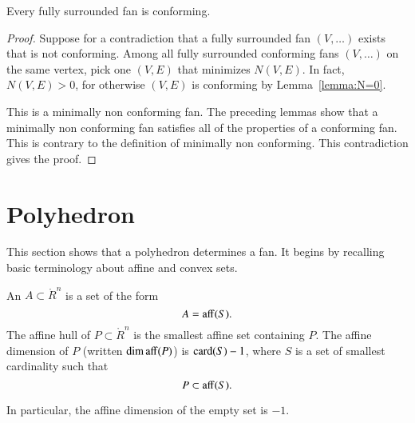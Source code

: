 \begin{lemma}\label{lemma:face}
Every fully surrounded fan is conforming.
\end{lemma}

\begin{proof}
Suppose for a contradiction that a fully surrounded fan $(V,\ldots)$
exists that is not conforming.  Among all fully surrounded
conforming fans $(V,\ldots)$ on the same vertex, pick one $(V,E)$
that minimizes $N(V,E)$.  In fact, $N(V,E)>0$, for otherwise $(V,E)$
is conforming by Lemma~\ref{lemma:N=0}.

This is a minimally non conforming fan.  The preceding lemmas show
that a minimally non conforming fan satisfies all of the properties
of a conforming fan.  This is contrary to the definition of
minimally non conforming.  This contradiction gives the proof.
\end{proof}



\section{Polyhedron}

This section shows that a polyhedron determines a fan.  It begins by
recalling basic terminology about affine and convex sets.

\begin{definition}
An   $A\subset\ring{R}^n$ is a set of the form
\begin{displaymath}
A={\operatorname{aff}}(S).
\end{displaymath}
The affine hull of $P\subset\ring{R}^n$ is the smallest affine set
containing $P$.  The affine dimension of $P$ (written $\operatorname{dim\,aff}(P)$) is
${\operatorname{card}}(S)-1$, where $S$ is a set of smallest cardinality such that
\begin{displaymath}
P \subset {\operatorname{aff}}(S).
\end{displaymath}
\end{definition}
In particular, the affine dimension of the empty set is $-1$.
%
%
%
%
%

